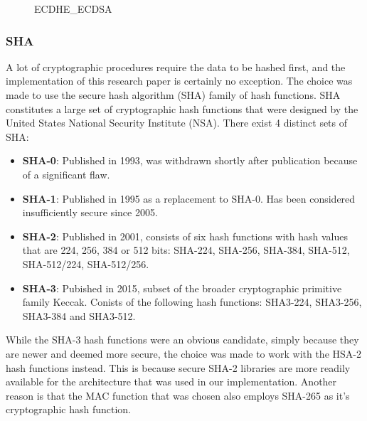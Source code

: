 \documentclass[11pt]{article}
\begin{document}
\begin{figure}[h]
	\centering
	\caption{ECDHE\_ECDSA}
	\label{fig:ECDH2}
\end{figure} 

\subsubsection{SHA} A lot of cryptographic procedures require the data to be hashed first, and the implementation of this research paper is certainly no exception. The choice was made to use the secure hash algorithm (SHA) family of hash functions. SHA constitutes a large set of cryptographic hash functions that were designed by the United States National Security Institute (NSA). There exist 4 distinct sets of SHA\cite{SHAwiki}:

\begin{itemize}
	\item \textbf{SHA-0}: Published in 1993, was withdrawn shortly after publication because of a significant flaw.
	
	\item \textbf{SHA-1}: Published in 1995 as a replacement to SHA-0. Has been considered insufficiently secure since 2005.
	
	\item \textbf{SHA-2}: Published in 2001, consists of six hash functions with hash values that are 224, 256, 384 or 512 bits: SHA-224, SHA-256, SHA-384, SHA-512, SHA-512/224, SHA-512/256.
	
	\item \textbf{SHA-3}: Pubished in 2015, subset of the broader cryptographic primitive family Keccak. Conists of the following hash functions: SHA3-224, SHA3-256, SHA3-384 and SHA3-512.
\end{itemize} 
While the SHA-3 hash functions were an obvious candidate, simply because they are newer and deemed more secure, the choice was made to work with the HSA-2 hash functions instead. This is because secure SHA-2 libraries are more readily available for the architecture that was used in our implementation. Another reason is that the MAC function that was chosen also employs SHA-265 as it's cryptographic hash function. 
\end{document}
